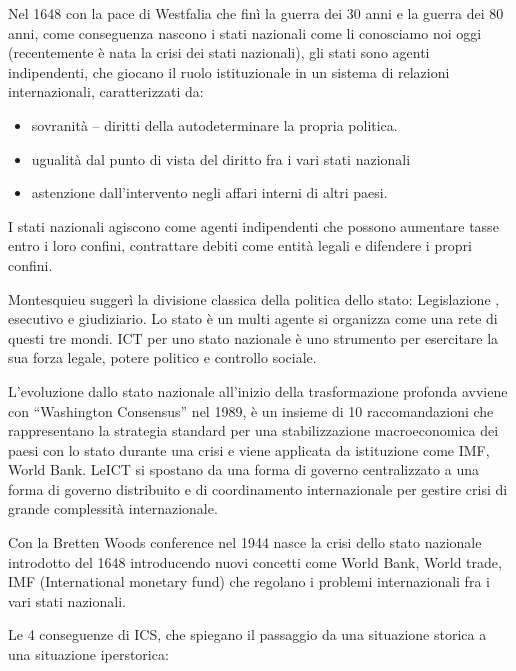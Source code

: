 \documentclass[a4page, 11pt]{article}
\begin{document}
Nel 1648 con la pace di Westfalia che finì la guerra dei 30 anni e la
guerra dei 80 anni, come conseguenza nascono i stati nazionali come li
conosciamo noi oggi (recentemente è nata la crisi dei stati nazionali),
gli stati sono agenti indipendenti, che giocano il ruolo istituzionale
in un sistema di relazioni internazionali, caratterizzati da:

\begin{itemize}
	 
	\item
	sovranità -- diritti della autodeterminare la propria politica.
	\item
	ugualità dal punto di vista del diritto fra i vari stati nazionali
	\item
	astenzione dall'intervento negli affari interni di altri paesi.
\end{itemize}

I stati nazionali agiscono come agenti indipendenti che possono
aumentare tasse entro i loro confini, contrattare debiti come entità
legali e difendere i propri confini.

Montesquieu suggerì la divisione classica della politica dello stato:
Legislazione , esecutivo e giudiziario. Lo stato è un multi agente si
organizza come una rete di questi tre mondi. ICT per uno stato nazionale
è uno strumento per esercitare la sua forza legale, potere politico e
controllo sociale.

L'evoluzione dallo stato nazionale all'inizio della trasformazione
profonda avviene con ``Washington Consensus'' nel 1989, è un insieme di
10 raccomandazioni che rappresentano la strategia standard per una
stabilizzazione macroeconomica dei paesi con lo stato durante una crisi
e viene applicata da istituzione come IMF, World Bank. LeICT si spostano
da una forma di governo centralizzato a una forma di governo distribuito
e di coordinamento internazionale per gestire crisi di grande
complessità internazionale.

Con la Bretten Woods conference nel 1944 nasce la crisi dello stato
nazionale introdotto del 1648 introducendo nuovi concetti come World
Bank, World trade, IMF (International monetary fund) che regolano i
problemi internazionali fra i vari stati nazionali.

Le 4 conseguenze di ICS, che spiegano il passaggio da una situazione
storica a una situazione iperstorica:
\end{document}
